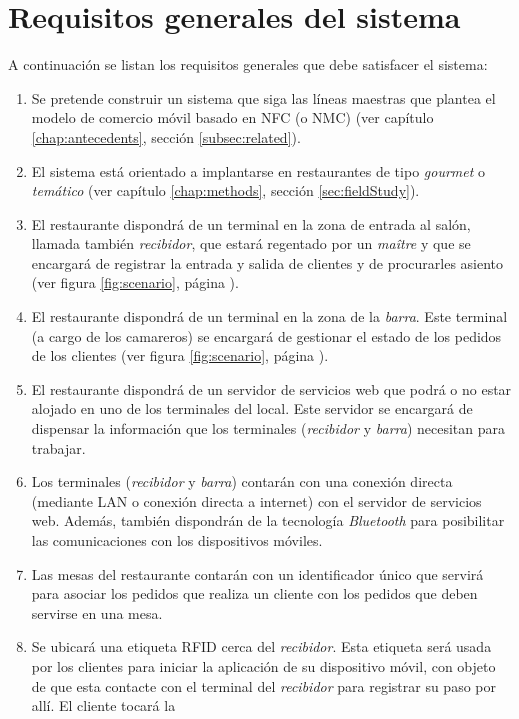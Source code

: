 \section{Requisitos generales del sistema}
A continuación se listan los requisitos generales que debe satisfacer el
sistema:
\begin{enumerate}
\item Se pretende construir un sistema que siga las líneas maestras que
plantea el modelo de comercio móvil basado en \acs{NFC} (o \acs{NMC}) (ver
capítulo \ref{chap:antecedents}, sección \ref{subsec:related}).
\item El sistema está orientado a implantarse en restaurantes de tipo
\emph{gourmet} o \emph{temático} (ver capítulo \ref{chap:methods}, sección 
\ref{sec:fieldStudy}).
\item El restaurante dispondrá de un terminal en la zona de entrada al salón,
llamada también \emph{recibidor}, que estará regentado por un \emph{maître} y
que se encargará de registrar la entrada y salida de clientes y de procurarles
asiento (ver figura \ref{fig:scenario}, página \pageref{fig:scenario}).
\item El restaurante dispondrá de un terminal en la zona de la \emph{barra}.
Este terminal (a cargo de los camareros) se encargará de gestionar el estado de
los pedidos de los clientes (ver figura \ref{fig:scenario}, página
\pageref{fig:scenario}).
\item El restaurante dispondrá de un servidor de servicios web que podrá o no
estar alojado en uno de los terminales del local. Este servidor se encargará
de dispensar la información que los terminales (\emph{recibidor} y
\emph{barra}) necesitan para trabajar.
\item Los terminales (\emph{recibidor} y \emph{barra}) contarán con una 
conexión directa (mediante \acs{LAN} o conexión directa a internet) con el
servidor de servicios web. Además, también dispondrán de la tecnología
\emph{Bluetooth} para posibilitar las comunicaciones con los dispositivos 
móviles.
\item Las mesas del restaurante contarán con un identificador único que
servirá para asociar los pedidos que realiza un cliente con los pedidos que
deben servirse en una mesa.
\item Se ubicará una etiqueta \acs{RFID} cerca del \emph{recibidor}. Esta
etiqueta será usada por los clientes para iniciar la aplicación de su
dispositivo móvil, con objeto de que esta contacte con el terminal del
\emph{recibidor} para registrar su paso por allí. El cliente tocará la

\end{enumerate}

